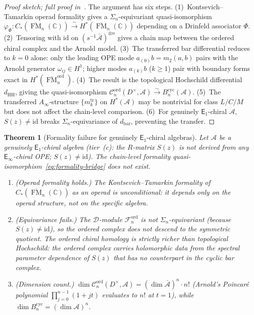 \documentclass[11pt,reqno]{amsart}
\newtheorem{theorem}{Theorem}[section]
\theoremstyle{definition}
\theoremstyle{remark}
\newcommand{\cA}{\mathcal{A}}
\newcommand{\cC}{\mathcal{C}}
\newcommand{\cD}{\mathcal{D}}
\newcommand{\cF}{\mathcal{F}}
\newcommand{\HH}{\mathrm{HH}}
\newcommand{\Ainf}{A_{\infty}}
\newcommand{\Eone}{\mathsf{E}_{1}}
\newcommand{\Einf}{\mathsf{E}_{\infty}}
\DeclareMathOperator{\FM}{FM}
\newcommand{\CC}{\mathbb{C}}
\newcommand{\id}{\mathrm{id}}
\numberwithin{equation}{section}
\begin{document}
\begin{proof}[Proof sketch; full proof
in~{\cite[\S I.3]{Lorgat26I}}]
The argument has six steps.
(1)~Kontsevich--Tamarkin operad formality gives a
$\Sigma_n$-equivariant quasi-isomorphism
$\varphi_\Phi \colon C_*(\overline{\FM}_n(\CC))
\xrightarrow{\sim} H^*(\overline{\FM}_n(\CC))$
depending on a Drinfeld associator $\Phi$.
(2)~Tensoring with $\id$ on $(s^{-1}\bar{\cA})^{\otimes n}$
gives a chain map between the ordered chiral complex and the
Arnold model.
(3)~The transferred bar differential reduces to $k=0$ alone:
only the leading OPE mode $a_{(0)}b = m_2(a,b)$ pairs with
the Arnold generator $\omega_{ij} \in H^1$; higher modes
$a_{(k)}b$ ($k \geq 1$) pair with boundary forms exact in
$H^*(\overline{\FM}_n^{\mathrm{ord}})$.
(4)~The result is the topological Hochschild differential $d_{\HH}$,
giving the quasi-isomorphism
$\cC_n^{\mathrm{ord}}(D^\times, \cA)
\xrightarrow{\sim} B^{\mathrm{cyc}}_n(\cA)$.
(5)~The transferred $\Ainf$-structure
$\{m_k^{\mathrm{tr}}\}$ on $H^*(\cA)$ may be nontrivial
for class $L/C/M$ but does not affect the chain-level
comparison.
(6)~For genuinely $\Eone$-chiral $\cA$, $S(z) \neq \id$
breaks $\Sigma_n$-equivariance of $d_{\mathrm{bar}}$,
preventing the transfer.
\end{proof}

\begin{theorem}[Formality failure for genuinely
$\Eone$-chiral algebras]
\label{thm:formality-failure}
Let $\cA$ be a genuinely $\Eone$-chiral algebra
\textup{(}tier~(c): the $R$-matrix $S(z)$ is not derived
from any $\Einf$-chiral OPE; $S(z) \neq \id$\textup{)}.
The chain-level formality
quasi-isomorphism~\eqref{eq:formality-bridge}
does \emph{not} exist.
\begin{enumerate}[label=\textup{(\roman*)}]
\item \textup{(Operad formality holds.)}
  The Kontsevich--Tamarkin formality of
  $C_*(\overline{\FM}_n(\CC))$ as an operad is
  unconditional: it depends only on the operad structure,
  not on the specific algebra.
\item \textup{(Equivariance fails.)}
  The $\cD$-module $\cF_n^{\mathrm{ord}}$ is not
  $\Sigma_n$-equivariant \textup{(}because
  $S(z) \neq \id$\textup{)}, so the ordered complex
  does \emph{not} descend to the symmetric quotient.
  The ordered chiral homology is strictly richer than
  topological Hochschild: the ordered complex carries
  holomorphic data from the spectral parameter
  dependence of $S(z)$ that has no counterpart in the
  cyclic bar complex.
\item \textup{(Dimension count.)}
  $\dim \cC_n^{\mathrm{ord}}(D^\times, \cA)
  = (\dim \bar{\cA})^n \cdot n!$
  (Arnold's Poincar\'e polynomial
  $\prod_{j=0}^{n-1}(1+jt)$ evaluates to $n!$ at $t=1$),
  while $\dim B^{\mathrm{cyc}}_n = (\dim \cA)^n$.
\end{enumerate}
\end{theorem}
\end{document}
